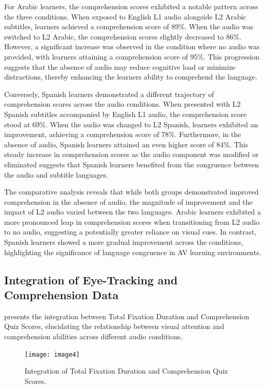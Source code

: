 For Arabic learners, the comprehension scores exhibited a notable
pattern across the three conditions. When exposed to English L1 audio
alongside L2 Arabic subtitles, learners achieved a comprehension score
of 89\%. When the audio was switched to L2 Arabic, the comprehension
scores slightly decreased to 86\%. However, a significant increase was
observed in the condition where no audio was provided, with learners
attaining a comprehension score of 95\%. This progression suggests that
the absence of audio may reduce cognitive load or minimize distractions,
thereby enhancing the learners\textquotesingle{} ability to comprehend
the language.

Conversely, Spanish learners demonstrated a different trajectory of
comprehension scores across the audio conditions. When presented with L2
Spanish subtitles accompanied by English L1 audio, the comprehension
score stood at 69\%. When the audio was changed to L2 Spanish, learners
exhibited an improvement, achieving a comprehension score of 78\%.
Furthermore, in the absence of audio, Spanish learners attained an even
higher score of 84\%. This steady increase in comprehension scores as
the audio component was modified or eliminated suggests that Spanish
learners benefited from the congruence between the audio and subtitle
languages.

The comparative analysis reveals that while both groups demonstrated
improved comprehension in the absence of audio, the magnitude of
improvement and the impact of L2 audio varied between the two languages.
Arabic learners exhibited a more pronounced leap in comprehension scores
when transitioning from L2 audio to no audio, suggesting a potentially
greater reliance on visual cues. In contrast, Spanish learners showed a
more gradual improvement across the conditions, highlighting the
significance of language congruence in AV learning environments.

\subsection{Integration of Eye-Tracking and Comprehension Data}\label{sub-sec-integrationofeyetracking}

 presents the integration between Total Fixation Duration and
Comprehension Quiz Scores, elucidating the relationship between visual
attention and comprehension abilities across different audio conditions.

\begin{figure}[htbp]
\centering
\caption{Integration of Total Fixation Duration and Comprehension Quiz Scores.}
\label{fig-04}
\texttt{[image: image4]}
\end{figure}

